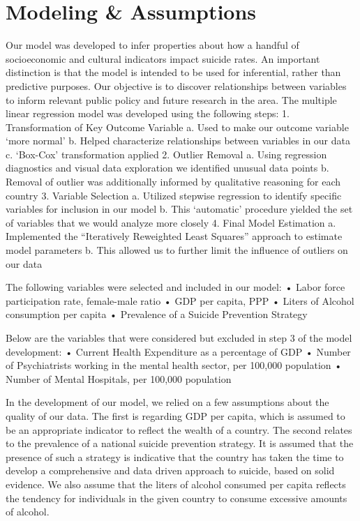 \documentclass[]{article}
\begin{document}
\section{Modeling \& Assumptions}\label{modeling-assumptions}

Our model was developed to infer properties about how a handful of
socioeconomic and cultural indicators impact suicide rates. An important
distinction is that the model is intended to be used for inferential,
rather than predictive purposes. Our objective is to discover
relationships between variables to inform relevant public policy and
future research in the area. The multiple linear regression model was
developed using the following steps: 1. Transformation of Key Outcome
Variable a. Used to make our outcome variable `more normal' b. Helped
characterize relationships between variables in our data c. `Box-Cox'
transformation applied 2. Outlier Removal a. Using regression
diagnostics and visual data exploration we identified unusual data
points b. Removal of outlier was additionally informed by qualitative
reasoning for each country 3. Variable Selection a. Utilized stepwise
regression to identify specific variables for inclusion in our model b.
This `automatic' procedure yielded the set of variables that we would
analyze more closely 4. Final Model Estimation a. Implemented the
``Iteratively Reweighted Least Squares'' approach to estimate model
parameters b. This allowed us to further limit the influence of outliers
on our data

The following variables were selected and included in our model: • Labor
force participation rate, female-male ratio • GDP per capita, PPP •
Liters of Alcohol consumption per capita • Prevalence of a Suicide
Prevention Strategy

Below are the variables that were considered but excluded in step 3 of
the model development: • Current Health Expenditure as a percentage of
GDP • Number of Psychiatrists working in the mental health sector, per
100,000 population • Number of Mental Hospitals, per 100,000 population

In the development of our model, we relied on a few assumptions about
the quality of our data. The first is regarding GDP per capita, which is
assumed to be an appropriate indicator to reflect the wealth of a
country. The second relates to the prevalence of a national suicide
prevention strategy. It is assumed that the presence of such a strategy
is indicative that the country has taken the time to develop a
comprehensive and data driven approach to suicide, based on solid
evidence. We also assume that the liters of alcohol consumed per capita
reflects the tendency for individuals in the given country to consume
excessive amounts of alcohol.
\end{document}
